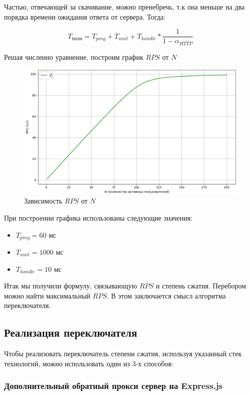 \documentclass[12pt]{article}
\begin{document}
Частью, отвечающей за скачивание, можно пренебречь, т.к она меньше на два порядка времени ожидания ответа от сервера. Тогда:

\[
    T_{\text{полн}} = T_{ping} + T_{wait} + T_{handle}*\frac{1}{1 - \alpha_{HTTP}}
\]

Решая численно уравнение, построим график $RPS$ от $N$

\begin{figure}[H]
    \centering
    \includegraphics[width=1\textwidth]{../images/rps-from-n.png}
    \caption{Зависимость $RPS$ от $N$}
\end{figure}

При построении графика использованы следующие значения:

\begin{itemize}
    \item $T_{ping} = 60   \text{ мс}$
    \item $T_{wait} = 1000 \text{ мс}$
    \item $T_{handle} = 10 \text{ мс}$
\end{itemize}

Итак мы получили формулу, связывающую $RPS$ и степень сжатия. Перебором можно найти максимальный $RPS$. В этом заключается смысл алгоритма переключателя.

\subsection{Реализация переключателя}

Чтобы реализовать переключатель степени сжатия, используя указанный стек технологий, можно использовать один из 3-х способов:

\subsubsection{Дополнительный обратный прокси сервер на Express.js}
\end{document}

